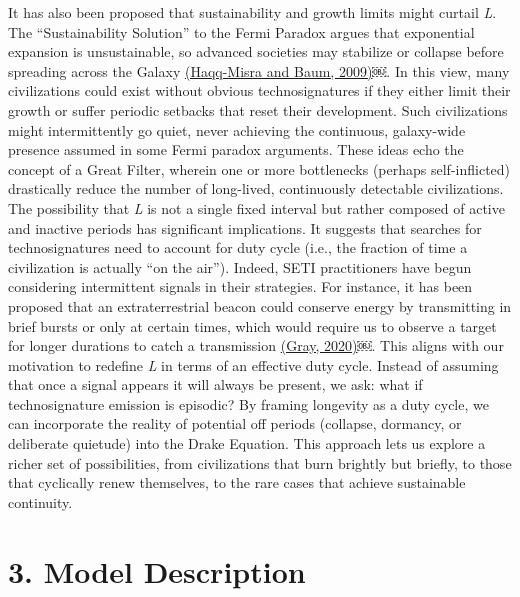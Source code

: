 It has also been proposed that sustainability and growth limits might curtail \emph{L}. The ``Sustainability Solution'' to the Fermi Paradox argues that exponential expansion is unsustainable, so advanced societies may stabilize or collapse before spreading across the Galaxy \href{https://paperpile.com/c/hQuIW4/lphP}{(Haqq-Misra and Baum, 2009)}￼. In this view, many civilizations could exist without obvious technosignatures if they either limit their growth or suffer periodic setbacks that reset their development. Such civilizations might intermittently go quiet, never achieving the continuous, galaxy-wide presence assumed in some Fermi paradox arguments. These ideas echo the concept of a Great Filter, wherein one or more bottlenecks (perhaps self-inflicted) drastically reduce the number of long-lived, continuously detectable civilizations. The possibility that \emph{L} is not a single fixed interval but rather composed of active and inactive periods has significant implications. It suggests that searches for technosignatures need to account for duty cycle (i.e., the fraction of time a civilization is actually ``on the air''). Indeed, SETI practitioners have begun considering intermittent signals in their strategies. For instance, it has been proposed that an extraterrestrial beacon could conserve energy by transmitting in brief bursts or only at certain times, which would require us to observe a target for longer durations to catch a transmission \href{https://paperpile.com/c/hQuIW4/ayaR}{(Gray, 2020)}￼. This aligns with our motivation to redefine \emph{L} in terms of an effective duty cycle. Instead of assuming that once a signal appears it will always be present, we ask: what if technosignature emission is episodic? By framing longevity as a duty cycle, we can incorporate the reality of potential off periods (collapse, dormancy, or deliberate quietude) into the Drake Equation. This approach lets us explore a richer set of possibilities, from civilizations that burn brightly but briefly, to those that cyclically renew themselves, to the rare cases that achieve sustainable continuity.

\section{3. Model Description}\label{model-description}

